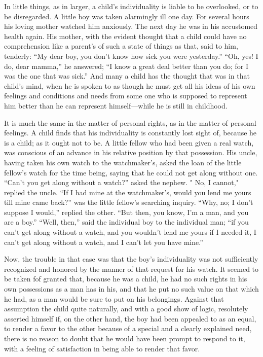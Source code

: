 \documentclass[
]{book}
\begin{document}
In little things, as in larger, a child's individuality is liable to be overlooked, or to be disregarded. A little boy was taken alarmingly ill one day. For several hours his loving mother watched him anxiously. The next day he was in his accustomed health again. His mother, with the evident thought that a child could have no comprehension like a parent's of such a state of things as that, said to him, tenderly: ``My dear boy, you don't know how sick you were yesterday.'' ``Oh, yes! I do, dear mamma,'' he answered; ``I know a great deal better than you do; for I was the one that was sick.'' And many a child has the thought that was in that child's mind, when he is spoken to as though he must get all his ideas of his own feelings and conditions and needs from some one who is supposed to represent him better than he can represent himself---while he is still in childhood.

It is much the same in the matter of personal rights, as in the matter of personal feelings. A child finds that his individuality is constantly lost sight of, because he is a child; as it ought not to be. A little fellow who had been given a real watch, was conscious of an advance in his relative position by that possession. His uncle, having taken his own watch to the watchmaker's, asked the loan of the little fellow's watch for the time being, saying that he could not get along without one. ``Can't you get along without a watch?'' asked the nephew. " No, I cannot," replied the uncle. ``If I had mine at the watchmaker's, would you lend me yours till mine came back?'' was the little fellow's searching inquiry. ``Why, no; I don't suppose I would,'' replied the other. ``But then, you know, I'm a man, and you are a boy.'' ``Well, then,'' said the individual boy to the individual man; ``if you can't get along without a watch, and you wouldn't lend me yours if I needed it, I can't get along without a watch, and I can't let you have mine.''

Now, the trouble in that case was that the boy's individuality was not sufficiently recognized and honored by the manner of that request for his watch. It seemed to be taken fof granted that, because he was a child, he had no such rights in his own possessions as a man has in his, and that he put no such value on that which he had, as a man would be sure to put on his belongings. Against that assumption the child quite naturally, and with a good show of logic, resolutely asserted himself if, on the other hand, the boy had been appealed to as an equal, to render a favor to the other because of a special and a clearly explained need, there is no reason to doubt that he would have been prompt to respond to it, with a feeling of satisfaction in being able to render that favor.
\end{document}
